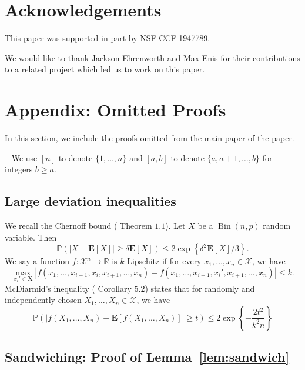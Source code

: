 \documentclass[11pt]{amsart}
\newcommand{\pparagraph}[1]{
\vspace{0.13in}\noindent{\textbf{\boldmath #1}}~}
\begin{document}
%
 \section{Acknowledgements}
This paper was supported in part by NSF CCF 1947789.  

We would like to thank Jackson Ehrenworth and Max Enis for their contributions to a 
related project which led us to work on this paper.
 

\section{Appendix: Omitted Proofs}\label{sec:appendix}
In this section, we include the proofs omitted from the main paper of the paper.

\pparagraph{Notation.} We use $[n]$ to denote $\{1, \ldots, n\}$ and $[a, b]$ to
denote $\{a, a+1, \ldots, b\}$ for integers $b\geq a$.


\subsection{Large deviation inequalities}
We recall the Chernoff bound (\cite{DP09} Theorem $1.1$). Let $X$ be a $\operatorname{Bin}(n,p)$ random variable. Then
\[
\mathbb{P}(|X - \mathbf{E}[X]| \geq \delta \mathbf{E}[X]) \leq 2\exp\left\{\delta^2\mathbf{E}[X]/3\right\}.
\]
We say a function $f:\mathcal{X}^n \rightarrow \mathbb{R}$ is $k$-Lipschitz if for every $x_1,\ldots,x_n \in \mathcal{X}$, we have
\[
\max_{x_i'\in \mathbf{X}}|f(x_1,\ldots,x_{i-1},x_i,x_{i+1},\ldots,x_n) - f(x_1,\ldots,x_{i-1},x_i',x_{i+1},\ldots,x_n)| \leq k.
\]
McDiarmid's inequality (\cite{DP09} Corollary $5.2$) states that for randomly and independently chosen $X_1,\ldots,X_n \in \mathcal{X}$, we have
\[
\mathbb{P}(|f(X_1,\ldots,X_n) - \mathbf{E}[f(X_1,\ldots,X_n)]| \geq t) \leq 2\exp\left\{-\frac{2t^2}{k^2n}\right\}
\]


\subsection{Sandwiching: Proof of Lemma~\ref{lem:sandwich}}
\end{document}

